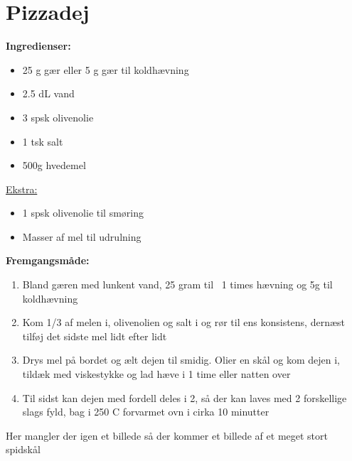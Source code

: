 \documentclass{book}
\begin{document}
\newpage {}
\newpage \section{Pizzadej}
\begin{minipage}[t]{0.5\textwidth}
\textbf{Ingredienser:}
\begin{itemize}
    \item 25 g gær eller 5 g gær til koldhævning
    \item 2.5 dL vand
    \item 3 spsk olivenolie
    \item 1 tsk salt
    \item 500g hvedemel
\end{itemize}
\underline{Ekstra:}
    \begin{itemize}
        \item  1 spsk olivenolie til smøring
        \item Masser af mel til udrulning
    \end{itemize}
\end{minipage}
\begin{minipage}[t]{0.5\textwidth}
\textbf{Fremgangsmåde:}
\begin{enumerate}
    \item Bland gæren med lunkent vand, 25 gram til ~1 times hævning og 5g til koldhævning
    \item Kom 1/3 af melen i, olivenolien og salt i og rør til ens konsistens, dernæst tilføj det sidste mel lidt efter lidt
    \item Drys mel på bordet og ælt dejen til smidig. Olier en skål og kom dejen i, tildæk med viskestykke og lad hæve i 1 time eller natten over
    \item Til sidst kan dejen med fordell deles i 2, så der kan laves med 2 forskellige slags fyld, bag i 250 \degree C forvarmet ovn i cirka 10 minutter 
\end{enumerate}
\end{minipage}
\newpage 
Her mangler der igen et billede så der kommer et billede af et meget stort spidskål 
\end{document}
